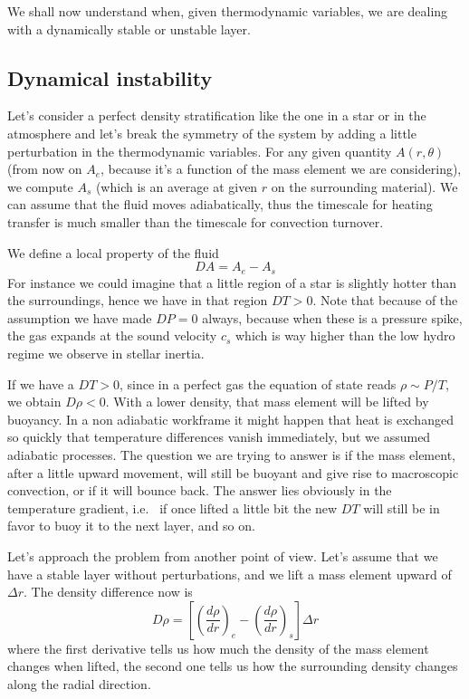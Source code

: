 We shall now understand when, given thermodynamic variables, we are dealing with a dynamically stable or unstable layer.


\subsection{Dynamical instability}
Let's consider a perfect density stratification like the one in a star or in the atmosphere and let's break the symmetry of the system by adding a little perturbation in the thermodynamic variables. For any given quantity $A(r, \theta)$ (from now on $A_e$, because it's a function of the mass element we are considering), we compute $A_s$ (which is an average at given $r$ on the surrounding material). We can assume that the fluid moves adiabatically, thus the timescale for heating transfer is much smaller than the timescale for convection turnover. 

We define a local property of the fluid 
$$
DA=A_e - A_s
$$
For instance we could imagine that a little region of a star is slightly hotter than the surroundings, hence we have in that region $DT > 0$. Note that because of the assumption we have made $DP=0$ always, because when these is a pressure spike, the gas expands at the sound velocity $c_s$ which is way higher than the low hydro regime we observe in stellar inertia.

If we have a $DT>0$, since in a perfect gas the equation of state reads $\rho \sim P/T$, we obtain $D \rho < 0$. With a lower density, that mass element will be lifted by buoyancy. In a non adiabatic workframe it might happen that heat is exchanged so quickly that temperature differences vanish immediately, but we assumed adiabatic processes. The question we are trying to answer is if the mass element, after a little upward movement, will still be buoyant and give rise to macroscopic convection, or if it will bounce back. The answer lies obviously in the temperature gradient, i.e. \ if once lifted a little bit the new $DT$ will still be in favor to buoy it to the next layer, and so on. 

Let's approach the problem from another point of view. Let's assume that we have a stable layer without perturbations, and we lift a mass element upward of $\Delta r$. The density difference now is
\begin{equation}\label{eq:displacement}
D \rho = \left [  \left( \frac{d \rho}{d r} \right)_e - \left( \frac{d \rho}{d r} \right)_s   \right ] \Delta r
\end{equation}
where the first derivative tells us how much the density of the mass element changes when lifted, the second one tells us how the surrounding density changes along the radial direction. 

